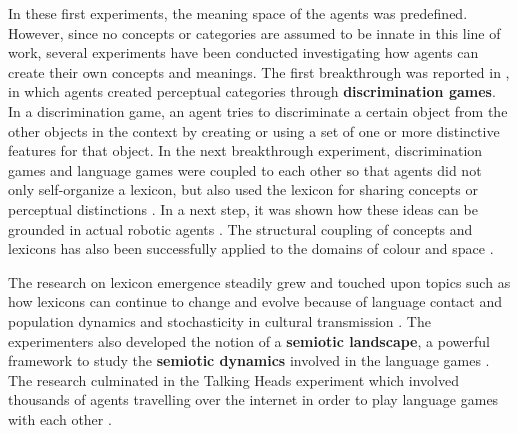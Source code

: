 In these first experiments, the meaning space of the agents was predefined. However, since no concepts or categories are assumed to be innate in this line of work, several experiments have been conducted investigating how agents can create their own concepts and meanings. The first breakthrough was reported in \citet{steels96perceptually}, in which agents created perceptual categories through {\bfseries discrimination games}. In a discrimination game, an agent tries to discriminate a certain object from the other objects in the context by creating or using a set of one or more distinctive features for that object. In the next breakthrough experiment, discrimination games and language games were coupled to each other so that agents did not only self-organize a lexicon, but also used the lexicon for sharing concepts or perceptual distinctions \citep{steels97constructing, steels97origins-ontologies, steels98structural, steels99how, steels99spontaneous}. In a next step, it was shown how these ideas can be grounded in actual robotic agents \citep{steels01role, steels02grounding, steels97grounding, vogt00lexicon}. The structural coupling of concepts and lexicons has also been successfully applied to the domains of colour \citep{belpaeme02factors, belpaeme05colourful, steels05coordinating} and space \citep{loetzsch08typological, steels08perspective-alignment}.

The research on lexicon emergence steadily grew and touched upon topics such as how lexicons can continue to change and evolve because of language contact and population dynamics \citep{steels97language-learning, steels99spatially} and stochasticity in cultural transmission \citep{kaplan98architecture, steels98spontaneous, steels98stochasticity}. The experimenters also developed the notion of a {\bfseries semiotic landscape}, a powerful framework to study the {\bfseries semiotic dynamics} involved in the language games \citep{steels99collective, steels99situated}. The research culminated in the Talking Heads experiment which involved thousands of agents travelling over the internet in order to play language games with each other \citep{steels99talking-heads, steels00puzzle, steels01language, steels99collective, steels99situated, steels02bootstrapping, steels02crucial}.

